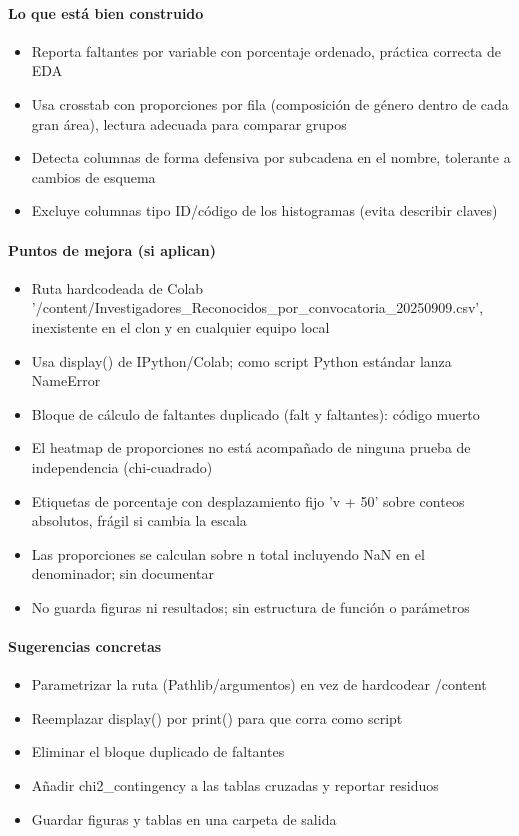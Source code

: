 \paragraph{Lo que está bien construido}
\begin{itemize}
  \item Reporta faltantes por variable con porcentaje ordenado, práctica correcta de EDA
  \item Usa crosstab con proporciones por fila (composición de género dentro de cada gran área), lectura adecuada para comparar grupos
  \item Detecta columnas de forma defensiva por subcadena en el nombre, tolerante a cambios de esquema
  \item Excluye columnas tipo ID/código de los histogramas (evita describir claves)
\end{itemize}

\paragraph{Puntos de mejora (si aplican)}
\begin{itemize}
  \item Ruta hardcodeada de Colab '/content/Investigadores\_Reconocidos\_por\_convocatoria\_20250909.csv', inexistente en el clon y en cualquier equipo local
  \item Usa display() de IPython/Colab; como script Python estándar lanza NameError
  \item Bloque de cálculo de faltantes duplicado (falt y faltantes): código muerto
  \item El heatmap de proporciones no está acompañado de ninguna prueba de independencia (chi-cuadrado)
  \item Etiquetas de porcentaje con desplazamiento fijo 'v + 50' sobre conteos absolutos, frágil si cambia la escala
  \item Las proporciones se calculan sobre n total incluyendo NaN en el denominador; sin documentar
  \item No guarda figuras ni resultados; sin estructura de función o parámetros
\end{itemize}

\paragraph{Sugerencias concretas}
\begin{itemize}
  \item Parametrizar la ruta (Pathlib/argumentos) en vez de hardcodear /content
  \item Reemplazar display() por print() para que corra como script
  \item Eliminar el bloque duplicado de faltantes
  \item Añadir chi2\_contingency a las tablas cruzadas y reportar residuos
  \item Guardar figuras y tablas en una carpeta de salida
\end{itemize}

